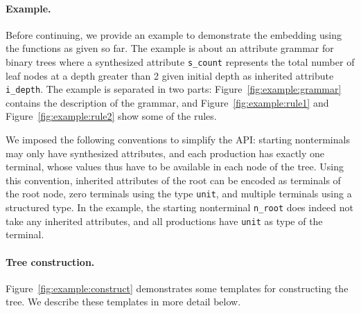 \documentclass{llncs}
\begin{document}
  \paragraph{Example.}
  Before continuing, we provide an example to demonstrate
  the embedding using the functions as given so far.
  The example is about an attribute grammar for binary
  trees where a synthesized attribute \lstinline$s_count$
  represents the total number of leaf nodes at a depth greater
  than 2 given initial depth as inherited attribute \lstinline$i_depth$.
  The example is separated in two parts: Figure~\ref{fig:example:grammar}
  contains the description of the grammar, and
  Figure~\ref{fig:example:rule1} and Figure~\ref{fig:example:rule2} show some of
  the rules.

  We imposed the following conventions to simplify the API: starting
  nonterminals may only have synthesized attributes, and each production
  has exactly one terminal, whose values thus have to be available in
  each node of the tree. Using this convention, inherited attributes
  of the root can be encoded as terminals of the root node, zero
  terminals using the type \lstinline$unit$, and multiple terminals
  using a structured type. In the example, the starting nonterminal
  \lstinline$n_root$ does indeed not take any inherited attributes,
  and all productions have \lstinline$unit$ as type of the terminal.

  \paragraph{Tree construction.}
  Figure~\ref{fig:example:construct} demonstrates
  some templates for constructing the tree. We
  describe these templates in more detail below.
\end{document}
